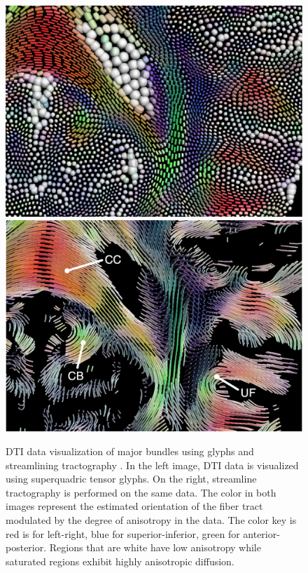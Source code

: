 \begin{figure} \label{fig:visualization}
	\includegraphics[width=0.5\linewidth]{packedglyphs}
	\includegraphics[width=0.5\linewidth]{tractography}
	\caption{DTI data visualization of major bundles using glyphs and streamlining tractography \cite{KindlmannTVCG2006}.  In the left image, DTI data is visualized using superquadric tensor glyphs. On the right, streamline tractography is performed on the same data.  The color in both images represent the estimated orientation of the fiber tract modulated by the degree of anisotropy in the data.  The color key is red is for left-right, blue for superior-inferior, green for anterior-posterior.  Regions that are white have low anisotropy while saturated regions exhibit highly anisotropic diffusion.}
\end{figure}


